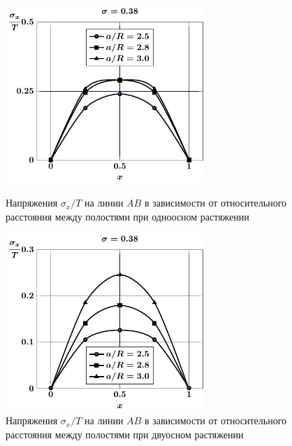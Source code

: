 \begin{russian}
\begin{figure}[h!]
\centering\footnotesize
\parbox[b]{7.5cm}{\centering\includegraphics[width=7.5cm]{spheres-cav13-a-t1-sig_x.pdf}
\caption{Напряжения $\sigma_x/T$ на линии $AB$ в зависимости от относительного расстояния между полостями при одноосном растяжении
\label{f:8:38}}}\hfil\hfil
\parbox[b]{7.5cm}{\centering\includegraphics[width=7.5cm]{spheres-cav13-a-t2-sig_x.pdf}
\caption{Напряжения $\sigma_x/T$ на линии $AB$ в зависимости от относительного расстояния между полостями при двуосном растяжении
\label{f:8:39}}}
\end{figure}


\end{russian}
